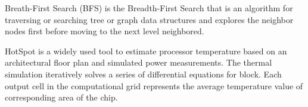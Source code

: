   Breath-First Search (BFS) is the Breadth-First Search that is an algorithm for traversing or searching tree or graph data structures and explores the neighbor nodes first before moving to the next level neighbored.

  HotSpot is a widely used tool \cite{R:24} to estimate processor temperature based on an architectural floor plan and simulated power measurements. The thermal simulation iteratively solves a series of differential equations for block. Each output cell in the computational grid represents the average temperature value of corresponding area of the chip.

  
